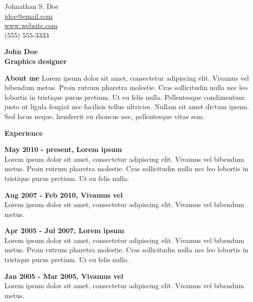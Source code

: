 \documentclass[a4paper,12pt,final]{memoir}
\newcommand{\Sep}{\vspace{1.5em}}
\newcommand{\SmallSep}{\vspace{0.5em}}
\newenvironment{AboutMe}
  {\ignorespaces\textbf{\color{RoyalBlue} About me}}
  {\Sep\ignorespacesafterend}
\newcommand{\CVSection}[1]
  {\Large\textbf{#1}\par
  \SmallSep\normalsize\normalfont}
\newcommand{\CVItem}[1]
  {\textbf{\color{RoyalBlue} #1}}
\begin{document}
%

\begin{flushright}\small
  Johnathan S. Doe \\
  \url{jdoe@email.com}  \\
  \url{www.website.com} \\
  (555) 555-3333
\end{flushright}\normalsize
\framebreak


\Huge\bfseries {\color{RoyalBlue} John Doe} \\
\Large\bfseries  Graphics designer \\

\normalsize\normalfont

\begin{AboutMe}
Lorem ipsum dolor sit amet, consectetur adipiscing elit. Vivamus vel bibendum metus. Proin rutrum pharetra molestie. Cras sollicitudin nulla nec leo lobortis in tristique purus pretium. Ut eu felis nulla. Pellentesque condimentum justo ut ligula feugiat nec facilisis tellus ultricies. Nullam sit amet dictum ipsum. Sed lacus neque, hendrerit eu rhoncus nec, pellentesque vitae sem.
\end{AboutMe}

\CVSection{Experience}
\CVItem{May 2010 - present, Lorem ipsum}\\
Lorem ipsum dolor sit amet, consectetur adipiscing elit. Vivamus vel bibendum metus. Proin rutrum pharetra molestie. Cras sollicitudin nulla nec leo lobortis in tristique purus pretium. Ut eu felis nulla.
\SmallSep

\CVItem{Aug 2007 - Feb 2010, Vivamus vel}\\
Lorem ipsum dolor sit amet, consectetur adipiscing elit. Vivamus vel bibendum metus.
\SmallSep

\CVItem{Apr 2005 - Jul 2007, Lorem ipsum}\\
Lorem ipsum dolor sit amet, consectetur adipiscing elit. Vivamus vel bibendum metus. Proin rutrum pharetra molestie. Cras sollicitudin nulla nec leo lobortis in tristique purus pretium. Ut eu felis nulla.
\SmallSep

\CVItem{Jan 2005 - Mar 2005, Vivamus vel}\\
Lorem ipsum dolor sit amet, consectetur adipiscing elit. Vivamus vel bibendum metus.
\SmallSep
\end{document}
